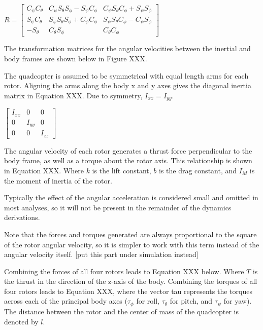 \documentclass[letterpaper,12pt,titlepage,oneside,final]{book}
\begin{document}
\begin{center}
$
R = 
\begin{bmatrix}
C_{\psi}C_{\theta} & C_{\psi}S_{\theta}S_{\phi} - S_{\psi}C_{\phi} & C_{\psi}S_{\theta}C_{\phi} + S_{\psi}S_{\phi} \\
S_{\psi}C_{\theta} & S_{\psi}S_{\theta}S_{\phi} + C_{\psi}C_{\phi} & S_{\psi}S_{\theta}C_{\phi} - C_{\psi}S_{\phi} \\
-S_{\theta} & C_{\theta}S_{\phi} & C_{\theta}C_{\phi}
\end{bmatrix}
$
\end{center}

The transformation matrices for the angular velocities between the inertial and body frames are shown below in Figure XXX.


The quadcopter is assumed to be symmetrical with equal length arms for each rotor. 
Aligning the arms along the body x and y axes gives the diagonal inertia matrix in Equation XXX. Due to symmetry, $I_{xx} = I_{yy}$.

\begin{center}
$
\begin{bmatrix}
I_{xx} & 0 & 0 \\
0 & I_{yy} & 0 \\
0 & 0 & I_{zz}
\end{bmatrix}
$
\end{center}

The angular velocity of each rotor generates a thrust force perpendicular to the body frame, as well as a torque about the rotor axis. 
This relationship is shown in Equation XXX. 
Where $k$ is the lift constant, $b$ is the drag constant, and $I_{M}$ is the moment of inertia of the rotor.


Typically the effect of the angular acceleration is considered small and omitted in most analyses, so it will not be present in the remainder of the dynamics derivations.

Note that the forces and torques generated are always proportional to the square of the rotor angular velocity, so it is simpler to work with this term instead of the angular velocity itself. [put this part under simulation instead]

Combining the forces of all four rotors leads to Equation XXX below. Where $T$ is the thrust in the direction of the z-axis of the body. 
Combining the torques of all four rotors leads to Equation XXX, where the vector tau represents the torques across each of the principal body axes ($\tau_{\phi}$ for roll, $\tau_{\theta}$ for pitch, and $\tau_{\psi}$ for yaw). 
The distance between the rotor and the center of mass of the quadcopter is denoted by $l$. 
\end{document}
